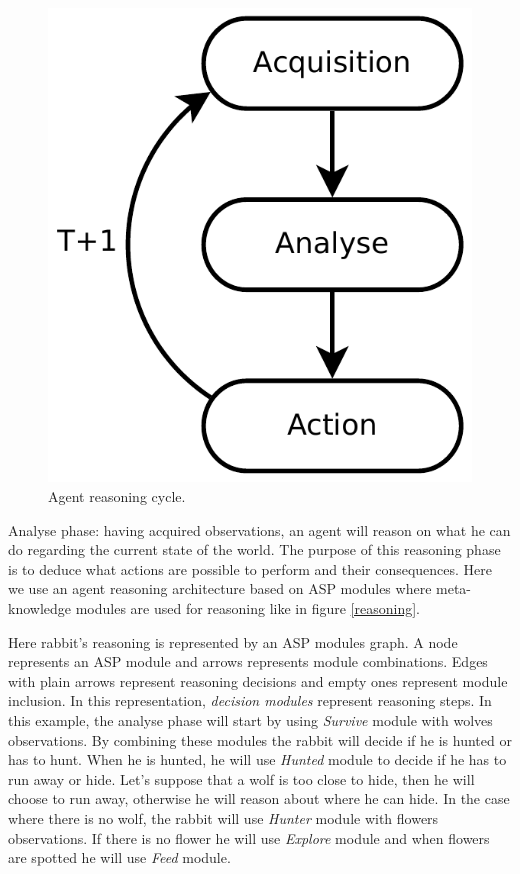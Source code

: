 \documentclass{aamas2012}
\begin{document}
	\begin{figure}
		\centering
		\includegraphics[keepaspectratio=true, scale=0.4]{framework.pdf}
		\caption
		{
			\label{framework_figure}
			Agent reasoning cycle.
		}
	\end{figure}
	
	Analyse phase: having acquired observations, an agent will reason on what he can do regarding the current state of the world.
	The purpose of this reasoning phase is to deduce what actions are possible to perform and their consequences.
	Here we use an agent reasoning architecture based on ASP modules where meta-knowledge modules are used for reasoning like in figure \ref{reasoning}.
	
	Here rabbit's reasoning is represented by an ASP modules graph.
	A node represents an ASP module and arrows represents module combinations.
	Edges with plain arrows represent reasoning decisions and empty ones represent module inclusion.
	In this representation, \emph{decision modules} represent reasoning steps.
	In this example, the analyse phase will start by using \emph{Survive} module with wolves observations.
	By combining these modules the rabbit will decide if he is hunted or has to hunt.
	When he is hunted, he will use \emph{Hunted} module to decide if he has to run away or hide.
	Let's suppose that a wolf is too close to hide, then he will choose to run away, otherwise he will reason about where he can hide.
	In the case where there is no wolf, the rabbit will use \emph{Hunter} module with flowers observations.
	If there is no flower he will use \emph{Explore} module and when flowers are spotted he will use \emph{Feed} module.
	
\end{document}
